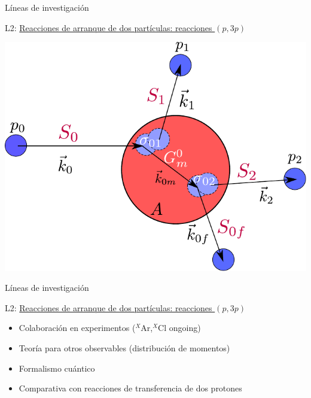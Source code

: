 \documentclass{beamer}
\begin{document}
\begin{frame}{Líneas de investigación} 

\large {}  L2: \underline{Reacciones de arranque de dos partículas: reacciones $(p, 3p)$} 

\normalsize
\begin{center}    
\includegraphics[height=0.5\textheight]{model.pdf}   
\end{center}
    
\end{frame}

\begin{frame}{Líneas de investigación} 

\large {}  L2: \underline{Reacciones de arranque de dos partículas: reacciones $(p, 3p)$} 

\normalsize
    
\begin{itemize}
\item Colaboración en experimentos ($^X$Ar,$^X$Cl ongoing)
\item Teoría para otros observables (distribución de momentos)
\item Formalismo cuántico
\item Comparativa con reacciones de transferencia de dos protones


\end{itemize}    
    
\end{frame}
\end{document}
